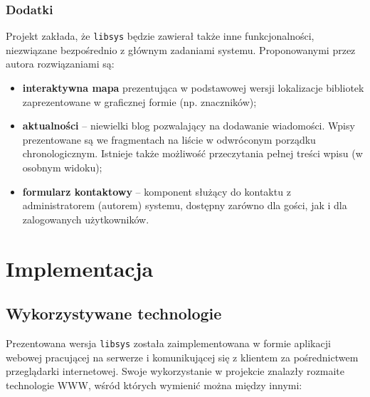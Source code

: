\documentclass[12pt, a4paper]{article}
\begin{document}
\subsubsection{Dodatki}
Projekt zakłada, że \texttt{libsys} będzie zawierał także inne funkcjonalności, niezwiązane bezpośrednio z głównym zadaniami systemu. Proponowanymi przez autora rozwiązaniami są:

\begin{itemize}
    \item \textbf{interaktywna mapa} prezentująca w podstawowej wersji lokalizacje bibliotek zaprezentowane w graficznej formie (np. znaczników);
    \item \textbf{aktualności} -- niewielki blog pozwalający na dodawanie wiadomości. Wpisy prezentowane są we fragmentach na liście w odwróconym porządku chronologicznym. Istnieje także możliwość przeczytania pełnej treści wpisu (w osobnym widoku);
    \item \textbf{formularz kontaktowy} -- komponent służący do kontaktu z administratorem (autorem) systemu, dostępny zarówno dla gości, jak i dla zalogowanych użytkowników.
\end{itemize}

\section{Implementacja}
\subsection{Wykorzystywane technologie}
\label{libsys_technologies}
Prezentowana wersja \texttt{libsys} została zaimplementowana w formie aplikacji webowej pracującej na serwerze i komunikującej się z klientem za pośrednictwem przeglądarki internetowej. Swoje wykorzystanie w projekcie znalazły rozmaite technologie WWW, wśród których wymienić można między innymi:
\end{document}
